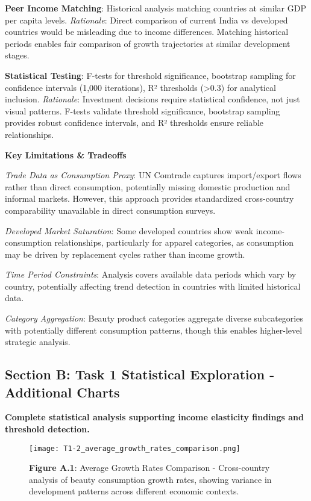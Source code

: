 \documentclass[11pt]{article}
\begin{document}
\textbf{Peer Income Matching}: Historical analysis matching countries at similar GDP per capita levels. \textit{Rationale}: Direct comparison of current India vs developed countries would be misleading due to income differences. Matching historical periods enables fair comparison of growth trajectories at similar development stages.

\textbf{Statistical Testing}: F-tests for threshold significance, bootstrap sampling for confidence intervals (1,000 iterations), R² thresholds (>0.3) for analytical inclusion. \textit{Rationale}: Investment decisions require statistical confidence, not just visual patterns. F-tests validate threshold significance, bootstrap sampling provides robust confidence intervals, and R² thresholds ensure reliable relationships.

\textbf{Key Limitations \& Tradeoffs}

\textit{Trade Data as Consumption Proxy}: UN Comtrade captures import/export flows rather than direct consumption, potentially missing domestic production and informal markets. However, this approach provides standardized cross-country comparability unavailable in direct consumption surveys.

\textit{Developed Market Saturation}: Some developed countries show weak income-consumption relationships, particularly for apparel categories, as consumption may be driven by replacement cycles rather than income growth.

\textit{Time Period Constraints}: Analysis covers available data periods which vary by country, potentially affecting trend detection in countries with limited historical data.

\textit{Category Aggregation}: Beauty product categories aggregate diverse subcategories with potentially different consumption patterns, though this enables higher-level strategic analysis.

\subsection*{Section B: Task 1 Statistical Exploration - Additional Charts}

\textbf{Complete statistical analysis supporting income elasticity findings and threshold detection.}


\begin{figure}[H]
\centering
\texttt{[image: T1-2\_average\_growth\_rates\_comparison.png]}
\caption{\textbf{Figure A.1}: Average Growth Rates Comparison - Cross-country analysis of beauty consumption growth rates, showing variance in development patterns across different economic contexts.}
\end{figure}
\end{document}

